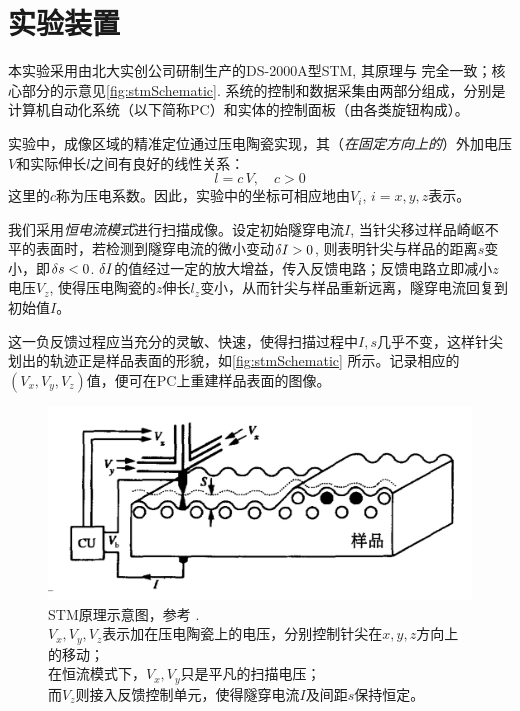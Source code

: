 \documentclass[aps,pre,12pt,preprint,%
	onecolumn,showpacs,showkeys,nofootinbib]{revtex4-1}
\begin{document}
\section{实验装置}
	本实验采用由北大实创公司研制生产的DS-2000A型STM, 其原理与 \cite{binnig1982surface} 完全一致；核心部分的示意见\autoref{fig:stmSchematic}. 系统的控制和数据采集由两部分组成，分别是计算机自动化系统（以下简称PC）和实体的控制面板（由各类旋钮构成）。
	
	实验中，成像区域的精准定位通过压电陶瓷实现，其（\textit{在固定方向上的}）外加电压$V$和实际伸长$l$之间有良好的线性关系：
	\begin{equation}
		l = c\,V,\quad c > 0
		\label{eq:piezoEq}
	\end{equation}
	这里的$c$称为压电系数。因此，实验中的坐标可相应地由$V_i,\,i=x,y,z$表示。
	
	我们采用\textit{恒电流模式}进行扫描成像。设定初始隧穿电流$I$, 当针尖移过样品崎岖不平的表面时，若检测到隧穿电流的微小变动$\var{I} > 0$, 则表明针尖与样品的距离$s$变小，即$\var{s} < 0$. $\var{I}$的值经过一定的放大增益，传入反馈电路；反馈电路立即减小$z$电压$V_z$, 使得压电陶瓷的$z$伸长$l_z$变小，从而针尖与样品重新远离，隧穿电流回复到初始值$I$。
	
	这一负反馈过程应当充分的灵敏、快速，使得扫描过程中$I,s$几乎不变，这样针尖划出的轨迹正是样品表面的形貌，如\autoref{fig:stmSchematic} 所示。记录相应的$(V_x,V_y,V_z)$值，便可在PC上重建样品表面的图像。
	
	\begin{figure}[!h]
	\centering
	\vspace{-0.5\baselineskip}
	\includegraphics[width=.75\linewidth]{stmSchematic.png}
	\caption[STM原理]{\textup{STM}原理示意图，参考 \cite{stmIBM}. \\
		$V_x,V_y,V_z$表示加在压电陶瓷上的电压，分别控制针尖在$x,y,z$方向上的移动；\\
		在恒流模式下，$V_x,V_y$只是平凡的扫描电压；\\
		而$V_z$则接入反馈控制单元，使得隧穿电流$I$及间距$s$保持恒定。
		\vspace{.5ex}
	}
	\label{fig:stmSchematic}
	\end{figure}
	
\end{document}
